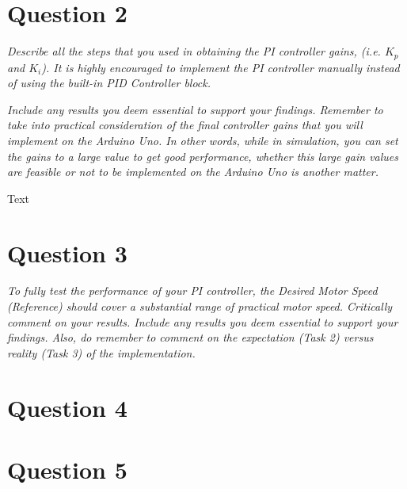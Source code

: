 \documentclass[11pt, onecolumn]{article}
\begin{document}
\section*{Question 2}
\par \textit{Describe all the steps that you used in obtaining the PI controller gains, (i.e. $K_p$ and $K_i$). It is highly encouraged to implement the PI controller manually instead of using the built-in PID Controller block.}
\par \textit{Include any results you deem essential to support your findings. Remember to take into practical consideration of the final controller gains that you will implement on the Arduino Uno. In other words, while in simulation, you can set the gains to a large value to get good performance, whether this large gain values are feasible or not to be implemented on the Arduino Uno is another matter.}
\par Text
\section*{Question 3}
\par \textit{To fully test the performance of your PI controller, the Desired Motor Speed (Reference) should cover a substantial range of practical motor speed. Critically comment on your results. Include any results you deem essential to support your findings. Also, do remember to comment on the expectation (Task 2) versus reality (Task 3) of the implementation.}

\lipsum[1]
\section*{Question 4}
\lipsum[1]
\section*{Question 5}
\lipsum[1]
\end{document}

